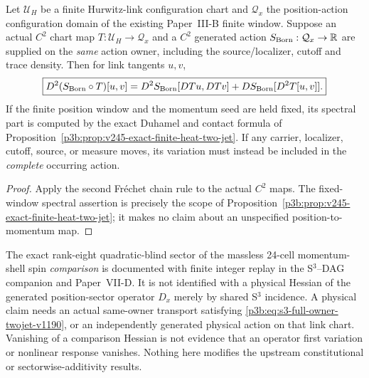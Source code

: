 \documentclass[12pt,a4paper]{article}
\begin{document}
\begin{proposition}
\label{p3b:prop:s3-full-owner-pullback-v1190}
Let $\mathcal U_H$ be a finite Hurwitz-link configuration chart and
$\mathcal Q_x$ the position-action configuration domain of the existing
Paper~III-B finite window.  Suppose an actual $C^2$ chart map
$T:\mathcal U_H\to\mathcal Q_x$ and a $C^2$ generated action
$S_{\rm Born}:\mathcal Q_x\to\mathbb R$ are supplied on the \emph{same}
action owner, including the source/localizer, cutoff and trace density.
Then for link tangents $u,v$,
\begin{equation}\label{p3b:eq:s3-full-owner-twojet-v1190}
\boxed{D^2(S_{\rm Born}\circ T)[u,v]
=D^2S_{\rm Born}[DTu,DTv]
 +DS_{\rm Born}[D^2T[u,v]].}
\end{equation}
If the finite position window and the momentum seed are held fixed,
its spectral part is computed by the exact Duhamel and contact formula of
Proposition~\ref{p3b:prop:v245-exact-finite-heat-two-jet}.
If any carrier, localizer, cutoff, source, or measure moves, its variation
must instead be included in the \emph{complete} occurring action.
\end{proposition}
\begin{proof}
Apply the second Fr\'echet chain rule to the actual $C^2$ maps.
The fixed-window spectral assertion is precisely the scope of
Proposition~\ref{p3b:prop:v245-exact-finite-heat-two-jet}; it makes no
claim about an unspecified position-to-momentum map.
\end{proof}

\begin{remark}
\label{p3b:rem:s3-comparison-owner-firewall-v1190}
The exact rank-eight quadratic-blind sector of the massless
24-cell momentum-shell spin \emph{comparison} is documented with finite
integer replay in the S$^3$--DAG companion and Paper~VII-D.
It is not identified with a physical Hessian of the generated
position-sector operator $D_x$ merely by shared S$^3$ incidence.
A physical claim needs an actual same-owner transport satisfying
\eqref{p3b:eq:s3-full-owner-twojet-v1190}, or an independently generated
physical action on that link chart.  Vanishing of a comparison Hessian
is not evidence that an operator first variation or nonlinear response
vanishes.  Nothing here modifies the upstream constitutional or
sectorwise-additivity results.
\end{remark}
\end{document}
